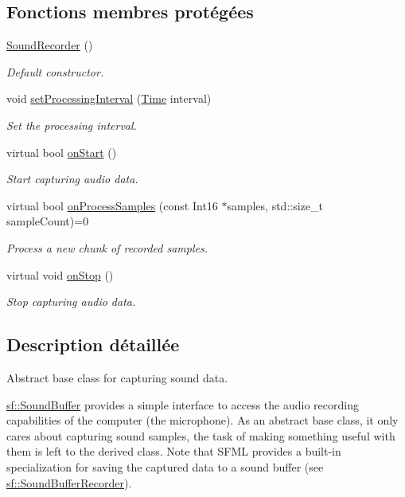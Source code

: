 \subsection*{Fonctions membres protégées}
\begin{DoxyCompactItemize}
\item 
\hyperlink{classsf_1_1SoundRecorder_a50ebad413c4f157408a0fa49f23212a9}{Sound\+Recorder} ()
\begin{DoxyCompactList}\small\item\em Default constructor. \end{DoxyCompactList}\item 
void \hyperlink{classsf_1_1SoundRecorder_a85b7fb8a86c08b5084f8f142767bccf6}{set\+Processing\+Interval} (\hyperlink{classsf_1_1Time}{Time} interval)
\begin{DoxyCompactList}\small\item\em Set the processing interval. \end{DoxyCompactList}\item 
virtual bool \hyperlink{classsf_1_1SoundRecorder_a7af418fb036201d3f85745bef78ce77f}{on\+Start} ()
\begin{DoxyCompactList}\small\item\em Start capturing audio data. \end{DoxyCompactList}\item 
virtual bool \hyperlink{classsf_1_1SoundRecorder_a2670124cbe7a87c7e46b4840807f4fd7}{on\+Process\+Samples} (const Int16 $\ast$samples, std\+::size\+\_\+t sample\+Count)=0
\begin{DoxyCompactList}\small\item\em Process a new chunk of recorded samples. \end{DoxyCompactList}\item 
virtual void \hyperlink{classsf_1_1SoundRecorder_aefc36138ca1e96c658301280e4a31b64}{on\+Stop} ()
\begin{DoxyCompactList}\small\item\em Stop capturing audio data. \end{DoxyCompactList}\end{DoxyCompactItemize}


\subsection{Description détaillée}
Abstract base class for capturing sound data. 

\hyperlink{classsf_1_1SoundBuffer}{sf\+::\+Sound\+Buffer} provides a simple interface to access the audio recording capabilities of the computer (the microphone). As an abstract base class, it only cares about capturing sound samples, the task of making something useful with them is left to the derived class. Note that S\+F\+ML provides a built-\/in specialization for saving the captured data to a sound buffer (see \hyperlink{classsf_1_1SoundBufferRecorder}{sf\+::\+Sound\+Buffer\+Recorder}).


